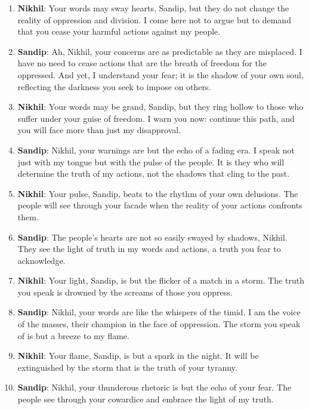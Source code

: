 \documentclass[10pt]{article}
\begin{document}
\begin{enumerate}
\item \textbf{Nikhil}: Your words may sway hearts, Sandip, but they do not change the reality of oppression and division. I come here not to argue but to demand that you cease your harmful actions against my people.

\item \textbf{Sandip}: Ah, Nikhil, your concerns are as predictable as they are misplaced. I have no need to cease actions that are the breath of freedom for the oppressed. And yet, I understand your fear; it is the shadow of your own soul, reflecting the darkness you seek to impose on others.

\item \textbf{Nikhil}: Your words may be grand, Sandip, but they ring hollow to those who suffer under your guise of freedom. I warn you now: continue this path, and you will face more than just my disapproval.

\item \textbf{Sandip}: Nikhil, your warnings are but the echo of a fading era. I speak not just with my tongue but with the pulse of the people. It is they who will determine the truth of my actions, not the shadows that cling to the past.

\item \textbf{Nikhil}: Your pulse, Sandip, beats to the rhythm of your own delusions. The people will see through your facade when the reality of your actions confronts them.

\item \textbf{Sandip}: The people's hearts are not so easily swayed by shadows, Nikhil. They see the light of truth in my words and actions, a truth you fear to acknowledge.

\item \textbf{Nikhil}: Your light, Sandip, is but the flicker of a match in a storm. The truth you speak is drowned by the screams of those you oppress.

\item \textbf{Sandip}: Nikhil, your words are like the whispers of the timid. I am the voice of the masses, their champion in the face of oppression. The storm you speak of is but a breeze to my flame.

\item \textbf{Nikhil}: Your flame, Sandip, is but a spark in the night. It will be extinguished by the storm that is the truth of your tyranny.

\item \textbf{Sandip}: Nikhil, your thunderous rhetoric is but the echo of your fear. The people see through your cowardice and embrace the light of my truth.


\end{enumerate}
\end{document}
